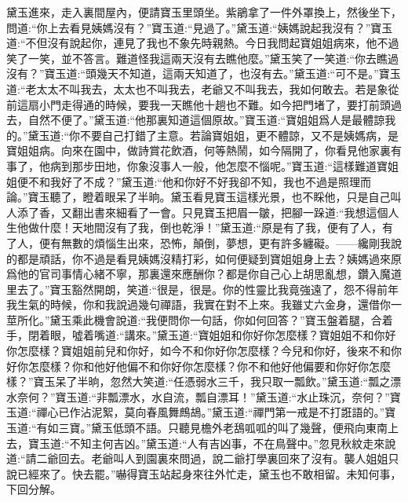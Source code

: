 \begin{parag}
    黛玉進來，走入裏間屋內，便請寶玉里頭坐。紫鵑拿了一件外罩換上，然後坐下，問道:“你上去看見姨媽沒有？”寶玉道:“見過了。”黛玉道:“姨媽說起我沒有？”寶玉道:“不但沒有說起你，連見了我也不象先時親熱。今日我問起寶姐姐病來，他不過笑了一笑，並不答言。難道怪我這兩天沒有去瞧他麼。”黛玉笑了一笑道:“你去瞧過沒有？”寶玉道:“頭幾天不知道，這兩天知道了，也沒有去。”黛玉道:“可不是。”寶玉道:“老太太不叫我去，太太也不叫我去，老爺又不叫我去，我如何敢去。若是象從前這扇小門走得通的時候，要我一天瞧他十趟也不難。如今把門堵了，要打前頭過去，自然不便了。”黛玉道:“他那裏知道這個原故。”寶玉道:“寶姐姐爲人是最體諒我的。”黛玉道:“你不要自己打錯了主意。若論寶姐姐，更不體諒，又不是姨媽病，是寶姐姐病。向來在園中，做詩賞花飲酒，何等熱鬧，如今隔開了，你看見他家裏有事了，他病到那步田地，你象沒事人一般，他怎麼不惱呢。”寶玉道:“這樣難道寶姐姐便不和我好了不成？”黛玉道:“他和你好不好我卻不知，我也不過是照理而論。”寶玉聽了，瞪着眼呆了半晌。黛玉看見寶玉這樣光景，也不睬他，只是自己叫人添了香，又翻出書來細看了一會。只見寶玉把眉一皺，把腳一跺道:“我想這個人生他做什麼！天地間沒有了我，倒也乾淨！”黛玉道:“原是有了我，便有了人，有了人，便有無數的煩惱生出來，恐怖，顛倒，夢想，更有許多纏礙。——纔剛我說的都是頑話，你不過是看見姨媽沒精打彩，如何便疑到寶姐姐身上去？姨媽過來原爲他的官司事情心緒不寧，那裏還來應酬你？都是你自己心上胡思亂想，鑽入魔道里去了。”寶玉豁然開朗，笑道:“很是，很是。你的性靈比我竟強遠了，怨不得前年我生氣的時候，你和我說過幾句禪語，我實在對不上來。我雖丈六金身，還借你一莖所化。”黛玉乘此機會說道:“我便問你一句話，你如何回答？”寶玉盤着腿，合着手，閉着眼，噓着嘴道:“講來。”黛玉道:“寶姐姐和你好你怎麼樣？寶姐姐不和你好你怎麼樣？寶姐姐前兒和你好，如今不和你好你怎麼樣？今兒和你好，後來不和你好你怎麼樣？你和他好他偏不和你好你怎麼樣？你不和他好他偏要和你好你怎麼樣？”寶玉呆了半晌，忽然大笑道:“任憑弱水三千，我只取一瓢飲。”黛玉道:“瓢之漂水奈何？”寶玉道:“非瓢漂水，水自流，瓢自漂耳！”黛玉道:“水止珠沉，奈何？”寶玉道:“禪心已作沾泥絮，莫向春風舞鷓鴣。”黛玉道:“禪門第一戒是不打誑語的。”寶玉道:“有如三寶。”黛玉低頭不語。只聽見檐外老鴰呱呱的叫了幾聲，便飛向東南上去，寶玉道:“不知主何吉凶。”黛玉道:“人有吉凶事，不在鳥聲中。”忽見秋紋走來說道:“請二爺回去。老爺叫人到園裏來問過，說二爺打學裏回來了沒有。襲人姐姐只說已經來了。快去罷。”嚇得寶玉站起身來往外忙走，黛玉也不敢相留。未知何事，下回分解。
\end{parag}